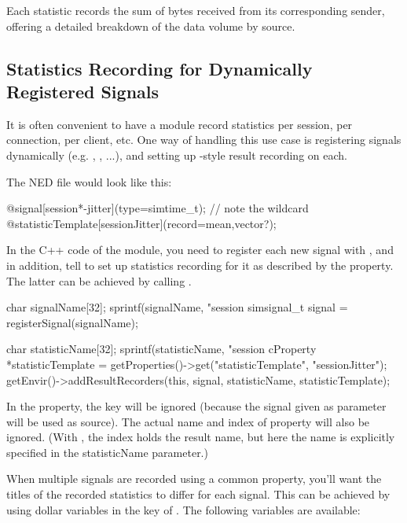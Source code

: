 \begin{ned}
Each statistic records the sum of bytes received from its corresponding sender,
offering a detailed breakdown of the data volume by source.


\subsection{Statistics Recording for Dynamically Registered Signals}
\label{sec:simple-modules:statistic-recording-dynamic-signals}

It is often convenient to have a module record statistics per session, per
connection, per client, etc. One way of handling this use case is registering
signals dynamically (e.g. , , ...),
and setting up -style result recording on each.

The NED file would look like this:

\begin{ned}
@signal[session*-jitter](type=simtime_t); // note the wildcard
@statisticTemplate[sessionJitter](record=mean,vector?);
\end{ned}

In the C++ code of the module, you need to register each new signal with
, and in addition, tell {\opp} to set up statistics
recording for it as described by the  property.
The latter can be achieved by calling .

\begin{cpp}
char signalName[32];
sprintf(signalName, "session%
simsignal_t signal = registerSignal(signalName);

char statisticName[32];
sprintf(statisticName, "session%
cProperty *statisticTemplate =
    getProperties()->get("statisticTemplate", "sessionJitter");
getEnvir()->addResultRecorders(this, signal, statisticName, statisticTemplate);
\end{cpp}

In the  property, the  key will be
ignored (because the signal given as parameter will be used as source). The
actual name and index of property will also be ignored. (With
, the index holds the result name, but here the name is
explicitly specified in the statisticName parameter.)

When multiple signals are recorded using a common 
property, you'll want the titles of the recorded statistics to differ
for each signal. This can be achieved by using dollar variables in the
 key of . The following variables
are available:


\end{ned}
